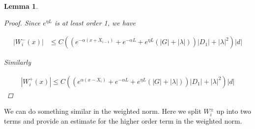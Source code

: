 \documentclass[12pt]{article}
\newtheorem{lemma}{Lemma}
\begin{document}
\begin{lemma}
\begin{proof}
Since $e^{\eta L}$ is at least order 1, we have

\begin{align*}
| W_i^-(x)| &\leq C\left(\left( e^{-\alpha(x + X_{i-1})} + e^{-\alpha L} + e^{\eta L}(|G| + |\lambda|) \right)|D_1| + |\lambda|^2 \right) |d|
\end{align*}

Similarly

\begin{align*}
| W_i^+(x)| \leq C\left(\left( e^{\alpha(x - X_{i})} + e^{-\alpha L} + e^{\eta L}(|G| + |\lambda|) \right)|D_1| + |\lambda|^2 \right) |d|
\end{align*}

\end{proof}

\end{lemma}

We can do something similar in the weighted norm. Here we split $W_i^\pm$ up into two terms and provide an estimate for the higher order term in the weighted norm.
\end{document}
